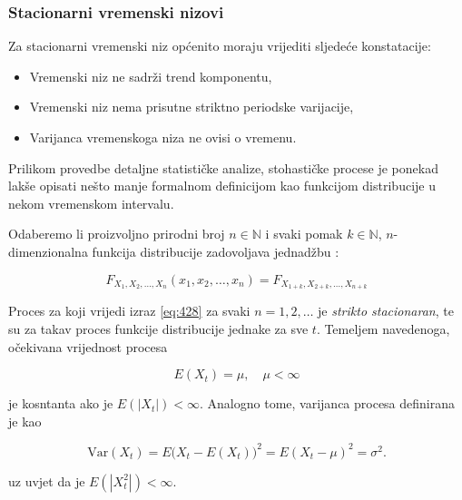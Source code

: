 \documentclass[a4paper,12pt,oneside]{memoir}
\begin{document}
            \subsubsection{Stacionarni vremenski nizovi}

            Za stacionarni vremenski niz općenito moraju vrijediti sljedeće konstatacije:

            \begin{itemize}
                \item Vremenski niz ne sadrži trend komponentu,
                \item Vremenski niz nema prisutne striktno periodske varijacije,
                \item Varijanca vremenskoga niza ne ovisi o vremenu.
            \end{itemize}

            Prilikom provedbe detaljne statističke analize, stohastičke procese je ponekad lakše opisati nešto manje formalnom definicijom kao funkcijom distribucije u nekom vremenskom intervalu.

            Odaberemo li proizvoljno prirodni broj $n\in \mathbb{N}$ i svaki pomak $k\in \mathbb{N}$, $n$-dimenzionalna funkcija distribucije zadovoljava jednadžbu \cite{Bahovec}:

            \begin{equation}
                F_{X_1,X_2,\ldots,X_n}(x_1,x_2,\ldots,x_n)=F_{X_{1+k},X_{2+k},\ldots,X_{n+k}}
                \label{eq:428}
            \end{equation}

            Proces za koji vrijedi izraz \eqref{eq:428} za svaki $n=1,2,\ldots$ je \textit{strikto stacionaran}, te su za takav proces funkcije distribucije jednake za sve $t$. Temeljem navedenoga, očekivana vrijednost procesa

            \begin{equation}
                E(X_t)=\mu, \quad \mu < \infty
            \end{equation}

            je kosntanta ako je $E(|X_t|)<\infty$. Analogno tome, varijanca procesa definirana je kao

            \begin{equation}
                \mathrm{Var}(X_t)=E\big(X_t-E(X_t)\big)^2=E(X_t-\mu)^2=\sigma^2.
            \end{equation}

            uz uvjet da je $E(|X_t^2|)<\infty$.
\end{document}

